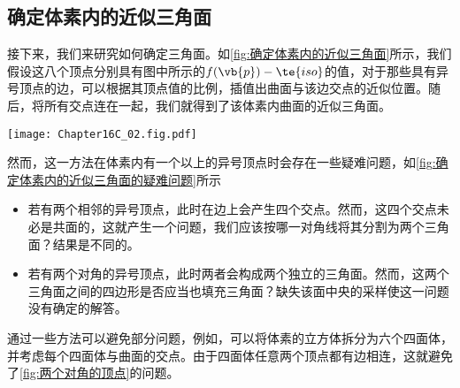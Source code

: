 \subsection{确定体素内的近似三角面}
接下来，我们来研究如何确定三角面。如\cref{fig:确定体素内的近似三角面}所示，我们假设这八个顶点分别具有图中所示的$f(\vb{p})-\te{iso}$的值，对于那些具有异号顶点的边，可以根据其顶点值的比例，插值出曲面与该边交点的近似位置。随后，将所有交点连在一起，我们就得到了该体素内曲面的近似三角面。
\begin{Figure}[确定体素内的近似三角面]
    \texttt{[image: Chapter16C\_02.fig.pdf]}
\end{Figure}
然而，这一方法在体素内有一个以上的异号顶点时会存在一些疑难问题，如\cref{fig:确定体素内的近似三角面的疑难问题}所示
\begin{itemize}
    \item 若有两个相邻的异号顶点，此时在边上会产生四个交点。然而，这四个交点未必是共面的，这就产生一个问题，我们应该按哪一对角线将其分割为两个三角面？结果是不同的。
    \item 若有两个对角的异号顶点，此时两者会构成两个独立的三角面。然而，这两个三角面之间的四边形是否应当也填充三角面？缺失该面中央的采样使这一问题没有确定的解答。
\end{itemize}
\begin{Figure}[确定体素内的近似三角面的疑难问题]
        \hspace{0.75cm}
\end{Figure}
通过一些方法可以避免部分问题，例如，可以将体素的立方体拆分为六个四面体，并考虑每个四面体与曲面的交点。由于四面体任意两个顶点都有边相连，这就避免了\cref{fig:两个对角的顶点}的问题。



